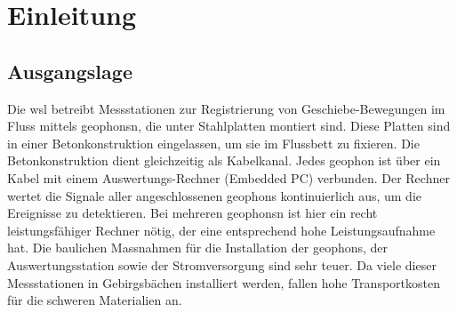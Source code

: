 %
%



\chapter{Einleitung}\label{chap.einleitung}

\section{Ausgangslage}\label{sec.ausgangslage}
Die \gls{wsl} betreibt Messstationen zur Registrierung von Geschiebe-Bewegungen im Fluss mittels \glspl{geophon}n, die unter Stahlplatten montiert sind. Diese Platten sind in einer Betonkonstruktion eingelassen, um sie im Flussbett zu fixieren. Die Betonkonstruktion dient gleichzeitig als Kabelkanal. Jedes \gls{geophon} ist über ein Kabel mit einem Auswertungs-Rechner (Embedded PC) verbunden. Der Rechner wertet die Signale aller angeschlossenen \glspl{geophon} kontinuierlich aus, um die Ereignisse zu detektieren. Bei mehreren \glspl{geophon}n ist hier ein recht leistungsfähiger Rechner nötig, der eine entsprechend hohe Leistungsaufnahme hat. Die baulichen Massnahmen für die Installation der \glspl{geophon}, der Auswertungsstation sowie der Stromversorgung sind sehr teuer. Da viele dieser Messstationen in Gebirgsbächen installiert werden, fallen hohe Transportkosten für die schweren Materialien an.

